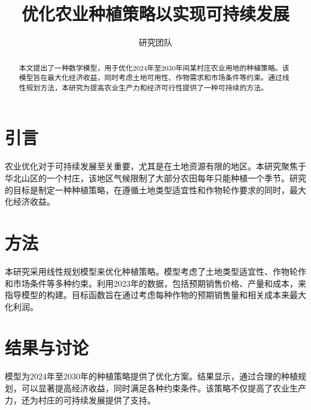 \documentclass{ctexart}
\title{优化农业种植策略以实现可持续发展}
\author{研究团队}
\begin{document}
\maketitle

\begin{abstract}
本文提出了一种数学模型，用于优化2024年至2030年间某村庄农业用地的种植策略。该模型旨在最大化经济收益，同时考虑土地可用性、作物需求和市场条件等约束。通过线性规划方法，本研究为提高农业生产力和经济可行性提供了一种可持续的方法。
\end{abstract}

\section{引言}

农业优化对于可持续发展至关重要，尤其是在土地资源有限的地区。本研究聚焦于华北山区的一个村庄，该地区气候限制了大部分农田每年只能种植一个季节。研究的目标是制定一种种植策略，在遵循土地类型适宜性和作物轮作要求的同时，最大化经济收益。

\section{方法}

本研究采用线性规划模型来优化种植策略。模型考虑了土地类型适宜性、作物轮作和市场条件等多种约束。利用2023年的数据，包括预期销售价格、产量和成本，来指导模型的构建。目标函数旨在通过考虑每种作物的预期销售量和相关成本来最大化利润。

\section{结果与讨论}

模型为2024年至2030年的种植策略提供了优化方案。结果显示，通过合理的种植规划，可以显著提高经济收益，同时满足各种约束条件。该策略不仅提高了农业生产力，还为村庄的可持续发展提供了支持。



\end{document}
